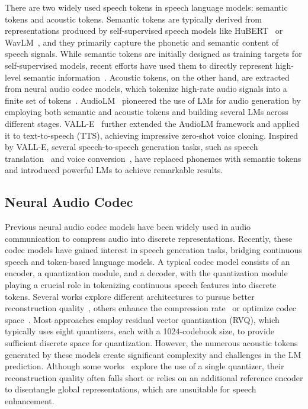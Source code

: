 There are two widely used speech tokens in speech language models: semantic tokens and acoustic tokens. Semantic tokens are typically derived from representations produced by self-supervised speech models like HuBERT~\citep{hsu2021hubert} or WavLM~\citep{chen2022wavlm}, and they primarily capture the phonetic and semantic content of speech signals. While semantic tokens are initially designed as training targets for self-supervised models, recent efforts have used them to directly represent high-level semantic information~\citep{borsos2023audiolm}. Acoustic tokens, on the other hand, are extracted from neural audio codec models, which tokenize high-rate audio signals into a finite set of tokens~\citep{defossez2022encodec}. AudioLM~\citep{borsos2023audiolm} pioneered the use of LMs for audio generation by employing both semantic and acoustic tokens and building several LMs across different stages. VALL-E~\citep{wang2023valle} further extended the AudioLM framework and applied it to text-to-speech (TTS), achieving impressive zero-shot voice cloning. Inspired by VALL-E, several speech-to-speech generation tasks, such as speech translation~\citep{dong2023polyvoice} and voice conversion~\citep{wang2023lmvc}, have replaced phonemes with semantic tokens and introduced powerful LMs to achieve remarkable results.

\subsection{Neural Audio Codec}
Previous neural audio codec models have been widely used in audio communication to compress audio into discrete representations. Recently, these codec models have gained interest in speech generation tasks, bridging continuous speech and token-based language models. A typical codec model consists of an encoder, a quantization module, and a decoder, with the quantization module playing a crucial role in tokenizing continuous speech features into discrete tokens.
Several works explore different architectures to pursue better reconstruction quality~\citep{wu2023audiodec,kumar2024dac,ai2024apcodec}, others enhance the compression rate~\citep{yang2023hifi,ji2024languagecodec,ji2024wavtokenizer} or optimize codec space~\citep{ren2024ticodec,ju2024naturalspeech3,zhang2023speechtokenizer,du2024funcodec,liu2024semanticodec}. 
Most approaches employ residual vector quantization (RVQ), which typically uses eight quantizers, each with a 1024-codebook size, to provide sufficient discrete space for quantization. However, the numerous acoustic tokens generated by these models create significant complexity and challenges in the LM prediction.
Although some works~\citep{li2024singlecodec,ji2024wavtokenizer} explore the use of a single quantizer, their reconstruction quality often falls short or relies on an additional reference encoder to disentangle global representations, which are unsuitable for speech enhancement.